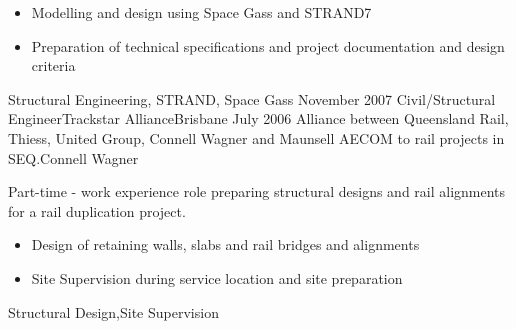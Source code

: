 \begin{experiences}
{        \begin{itemize}
		\item Modelling and design using Space Gass and STRAND7
		\item Preparation of technical specifications and project documentation and design criteria
               \end{itemize}
                    }
                    {Structural Engineering, STRAND, Space Gass} 
  \emptySeparator   
  \consultantexperience
  {November 2007}    {Civil/Structural Engineer}{Trackstar Alliance}{Brisbane}
  {July 2006}       {Alliance between Queensland Rail, Thiess, United Group, Connell Wagner and Maunsell AECOM to rail projects in SEQ.}{Connell Wagner}
  		{Part-time - work experience role preparing structural designs and rail alignments for a rail duplication project.                 
                      \begin{itemize}
		\item Design of retaining walls, slabs and rail bridges and alignments
		\item Site Supervision during service location and site preparation
                      \end{itemize}
                    }
                    {Structural Design,Site Supervision}   
  \emptySeparator            
\end{experiences}

